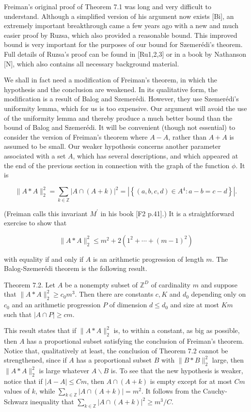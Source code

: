 \documentclass[10pt]{article}
\begin{document}
Freiman's original proof of Theorem 7.1 was long and very difficult to understand. Although a simplified version of his argument now exists [Bi], an extremely important breakthrough came a few years ago with a new and much easier proof by Ruzsa, which also provided a reasonable bound. This improved bound is very important for the purposes of our bound for Szemerédi's theorem. Full details of Ruzsa's proof can be found in [Ru1,2,3] or in a book by Nathanson [N], which also contains all necessary background material.

We shall in fact need a modification of Freiman's theorem, in which the hypothesis and the conclusion are weakened. In its qualitative form, the modification is a result of Balog and Szemerédi. However, they use Szemerédi's uniformity lemma, which for us is too expensive. Our argument will avoid the use of the uniformity lemma and thereby produce a much better bound than the bound of Balog and Szemerédi. It will be convenient (though not essential) to consider the version of Freiman's theorem where $A-A$, rather than $A+A$ is assumed to be small. Our weaker hypothesis concerns another parameter associated with a set $A$, which has several descriptions, and which appeared at the end of the previous section in connection with the graph of the function $\phi$. It is

$$
\|A * A\|_{2}^{2}=\sum_{k \in \mathbb{Z}}|A \cap(A+k)|^{2}=\left|\left\{(a, b, c, d) \in A^{4}: a-b=c-d\right\}\right| .
$$

(Freiman calls this invariant $M^{\prime}$ in his book [F2 p.41].) It is a straightforward exercise to show that

$$
\|A * A\|_{2}^{2} \leqslant m^{2}+2\left(1^{2}+\cdots+(m-1)^{2}\right)
$$

with equality if and only if $A$ is an arithmetic progression of length $m$. The Balog-Szemerédi theorem is the following result.

Theorem 7.2. Let $A$ be a nonempty subset of $\mathbb{Z}^{D}$ of cardinality $m$ and suppose that $\|A * A\|_{2}^{2} \geqslant c_{0} m^{3}$. Then there are constants $c, K$ and $d_{0}$ depending only on $c_{0}$ and an arithmetic progression $P$ of dimension $d \leqslant d_{0}$ and size at most $K m$ such that $|A \cap P| \geqslant c m$.

This result states that if $\|A * A\|_{2}^{2}$ is, to within a constant, as big as possible, then $A$ has a proportional subset satisfying the conclusion of Freiman's theorem. Notice that, qualitatively at least, the conclusion of Theorem 7.2 cannot be strengthened, since if $A$ has a proportional subset $B$ with $\|B * B\|_{2}^{2}$ large, then $\|A * A\|_{2}^{2}$ is large whatever $A \backslash B$ is. To see that the new hypothesis is weaker, notice that if $|A-A| \leqslant C m$, then $A \cap(A+k)$ is empty except for at most $C m$ values of $k$, while $\sum_{k \in \mathbb{Z}}|A \cap(A+k)|=m^{2}$. It follows from the Cauchy-Schwarz inequality that $\sum_{k \in \mathbb{Z}}|A \cap(A+k)|^{2} \geqslant m^{3} / C$.
\end{document}
